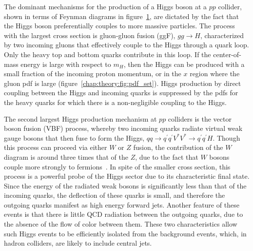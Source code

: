 \begin{figure}[h]
    \centering
    \caption[]{}
\label{chap:theory:fig:higgs_diagrams}
\end{figure}

The dominant mechanisms for the production of a Higgs boson at
a $pp$ collider, shown in terms of Feynman diagrams in
figure~\ref{chap:theory:fig:higgs_diagrams}, are dictated by the fact
that the Higgs boson preferentially couples to more massive particles. The
process with the
largest cross section is gluon-gluon fusion (ggF), $gg\rightarrow{H}$, characterized by
two incoming gluons that effectively couple to the Higgs through a
quark loop. Only the heavy top and bottom quarks contribute in this loop. If the
center-of-mass energy is large with respect to $m_H$, then the Higgs
can be produced with a small fraction of the incoming proton
momentum, or in the $x$ region where the gluon pdf is
large (figure~\ref{chap:theory:fig:pdf_set}). Higgs production by direct coupling between the Higgs
and incoming quarks is suppressed by the pdfs for the heavy quarks for
which there is a non-negligible coupling to the Higgs.

The second largest Higgs production mechanism at $pp$ colliders is the
vector boson fusion (VBF) process, whereby two incoming quarks radiate
virtual weak gauge bosons that then fuse to form the Higgs,
$qq\rightarrow{q^{\prime}q^{\prime}V^{\ast}V^{\ast}}\rightarrow{q^{\prime}q^{\prime}H}$. Though
this process can proceed via either $W$ or $Z$ fusion, the
contribution of the $W$ diagram is around three times that of the $Z$,
due to the fact that $W$ bosons couple more strongly to
fermions~\cite{bib:Djouadi:2005gi}. In spite of the smaller cross
section, this process is a powerful probe of the Higgs sector due to its
characteristic final state. Since the energy of the radiated weak
bosons is significantly less than that of the incoming quarks, the
deflection of these quarks is small, and therefore the outgoing quarks
manifest as high energy forward jets. Another feature of these events is that
there is little QCD radiation between the outgoing quarks, due to the
absence of the flow of color between them. These two characteristics
allow such Higgs events to be efficiently isolated from the background
events, which, in hadron colliders, are likely to include central
jets. 

